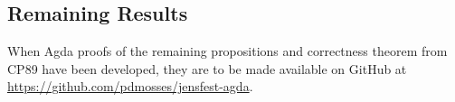 {\begin{code}
\AgdaSymbol{)}\AgdaSpace{}%
\AgdaSymbol{)}\AgdaSpace{}%
\AgdaSymbol{(}\AgdaSpace{}%
\AgdaSymbol{(}\AgdaSpace{}%
\AgdaSymbol{(}\AgdaSpace{}%
\AgdaSymbol{))}\AgdaSpace{}%
\AgdaSpace{}%
\AgdaSymbol{)}\<%
\\
%
\>[10]\AgdaSpace{}%
\AgdaSpace{}%
\AgdaSymbol{(}\AgdaSpace{}%
\AgdaSymbol{(}\AgdaSpace{}%
\AgdaSymbol{)}\AgdaSpace{}%
\AgdaSpace{}%
\AgdaSpace{}%
\AgdaSpace{}%
\AgdaSymbol{)}\AgdaSpace{}%
\<%
\\
\>[10][@{}l@{\AgdaIndent{0}}]%
\>[12]\AgdaSpace{}%
\AgdaSymbol{(}\AgdaSpace{}%
\AgdaSymbol{(}\AgdaSpace{}%
\AgdaSymbol{))}\AgdaSpace{}%
\AgdaSpace{}%
\AgdaSpace{}%
\AgdaSpace{}%
\AgdaSpace{}%
\AgdaSymbol{(}\AgdaSpace{}%
\AgdaSpace{}%
\AgdaSymbol{)}\<%
\\
%
\>[10]\<%
\end{code}
}

\subsection{Remaining Results}

When Agda proofs of the remaining propositions and correctness theorem from CP89
have been developed, they are to be made available on GitHub at
\url{https://github.com/pdmosses/jensfest-agda}.

